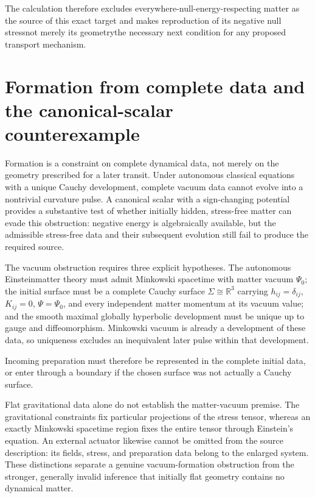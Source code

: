 \documentclass[11pt]{article}
\begin{document}
The calculation therefore excludes everywhere-null-energy-respecting matter as the source of this exact target and makes reproduction of its negative null stress\textemdash{}not merely its geometry\textemdash{}the necessary next condition for any proposed transport mechanism.

\section{Formation from complete data and the canonical-scalar counterexample}
Formation is a constraint on complete dynamical data, not merely on the geometry prescribed for a later transit. Under autonomous classical equations with a unique Cauchy development, complete vacuum data cannot evolve into a nontrivial curvature pulse. A canonical scalar with a sign-changing potential provides a substantive test of whether initially hidden, stress-free matter can evade this obstruction: negative energy is algebraically available, but the admissible stress-free data and their subsequent evolution still fail to produce the required source.

The vacuum obstruction requires three explicit hypotheses. The autonomous Einstein\textendash{}\allowbreak{}matter theory must admit Minkowski spacetime with matter vacuum $\Psi_0$; the initial surface must be a complete Cauchy surface $\Sigma\cong\mathbb{R}^3$ carrying $h_{ij}=\delta_{ij}$, $K_{ij}=0$, $\Psi=\Psi_0$, and every independent matter momentum at its vacuum value; and the smooth maximal globally hyperbolic development must be unique up to gauge and diffeomorphism. Minkowski vacuum is already a development of these data, so uniqueness excludes an inequivalent later pulse within that development.

Incoming preparation must therefore be represented in the complete initial data, or enter through a boundary if the chosen surface was not actually a Cauchy surface.

Flat gravitational data alone do not establish the matter-vacuum premise. The gravitational constraints fix particular projections of the stress tensor, whereas an exactly Minkowski spacetime region fixes the entire tensor through Einstein's equation. An external actuator likewise cannot be omitted from the source description: its fields, stress, and preparation data belong to the enlarged system. These distinctions separate a genuine vacuum-formation obstruction from the stronger, generally invalid inference that initially flat geometry contains no dynamical matter.
\end{document}
